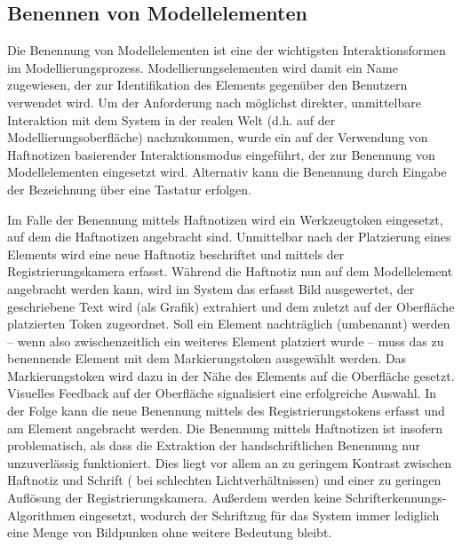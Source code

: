 
\subsection{Benennen von Modellelementen} %
\label{sub:benennen_von_modellelementen}

Die Benennung von Modellelementen ist eine der wichtigsten Interaktionsformen im Modellierungsprozess. Modellierungselementen wird damit ein Name zugewiesen, der zur Identifikation des Elements gegenüber den Benutzern verwendet wird. Um der Anforderung nach möglichst direkter, unmittelbare Interaktion mit dem System in der realen Welt (d.h. auf der Modellierungsoberfläche) nachzukommen, wurde ein auf der Verwendung von Haftnotizen basierender Interaktionsmodus eingeführt, der zur Benennung von Modellelementen eingesetzt wird. Alternativ kann die Benennung durch Eingabe der Bezeichnung über eine Tastatur erfolgen.

Im Falle der Benennung mittels Haftnotizen wird ein Werkzeugtoken eingesetzt, auf dem die Haftnotizen angebracht sind. Unmittelbar nach der Platzierung eines Elements wird eine neue Haftnotiz beschriftet und mittels der Registrierungskamera erfasst. Während die Haftnotiz nun auf dem Modellelement angebracht werden kann, wird im System das erfasst Bild ausgewertet, der geschriebene Text wird (als Grafik) extrahiert und dem zuletzt auf der Oberfläche platzierten Token zugeordnet. Soll ein Element nachträglich (umbenannt) werden -- wenn also zwischenzeitlich ein weiteres Element platziert wurde -- muss das zu benennende Element mit dem Markierungstoken ausgewählt werden. Das Markierungstoken wird dazu in der Nähe des Elements auf die Oberfläche gesetzt. Visuelles Feedback auf der Oberfläche signalisiert eine erfolgreiche Auswahl. In der Folge kann die neue Benennung mittels des Registrierungstokens erfasst und am Element angebracht werden. Die Benennung mittels Haftnotizen ist insofern problematisch, als dass die Extraktion der handschriftlichen Benennung nur unzuverlässig funktioniert. Dies liegt vor allem an zu geringem Kontrast zwischen Haftnotiz und Schrift ( bei schlechten Lichtverhältnissen) und einer zu geringen Auflösung der Registrierungskamera. Außerdem werden keine Schrifterkennungs-Algorithmen eingesetzt, wodurch der Schriftzug für das System immer lediglich eine Menge von Bildpunken ohne weitere Bedeutung bleibt.

